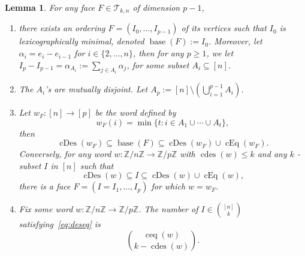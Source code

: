 \documentclass[12pt,reqno]{amsart}
\theoremstyle{plain}
\newtheorem{lemma}[theorem]{Lemma}
\theoremstyle{definition}
\newcommand{\Z}{\mathbb{Z}}
\newcommand{\Tri}{\mathcal{T}_{k,n}}
\DeclareMathOperator{\base}{base}
\DeclareMathOperator{\cEq}{cEq}
\DeclareMathOperator{\cDes}{cDes}
\DeclareMathOperator{\cdes}{cdes}
\DeclareMathOperator{\ceq}{ceq}
\begin{document}
\begin{lemma}\label{lem:alcove_to_word}
	For any face $ F \in \Tri $ of dimension $ p-1 $,
	\begin{enumerate}
		\item there exists an ordering $ F =(I_0,\dots,I_{p-1}) $ of its vertices such that $I_0$ is lexicographically
		minimal, denoted $ \base(F):= I_0 $. Moreover, let $\alpha_i = e_{i} - e_{i-1}$ for $i \in \{2,\dots,n\}$, then
		for any $p \geq 1$, we let $I_{p} - I_{p-1} = \alpha_{A_i}:= \sum_{j\in A_i}\alpha_j$, for some subset $A_i \subseteq [n]$.
		\item The $ A_i $'s are mutually disjoint. Let $ A_{p}:= [n] \setminus \left(\bigcup_{i=1}^{p-1} A_i\right) $.
		\item Let $ w_F: [n] \to [p] $ be the word defined by
		\begin{equation}\label{eq:wF}
			w_F(i) = \min\{t: i \in A_1 \cup \cdots \cup A_t\},
		\end{equation}
		then
		\begin{equation}\label{eq:Fdeseq}
			\cDes(w_F) \subseteq \base(F) \subseteq \cDes(w_F) \cup \cEq(w_F).
		\end{equation}
		Conversely, for any word $ w: \Z/n\Z \to \Z/p\Z $ with $ \cdes(w) \leq k $ and any $ k $ -subset $ I $ in $ [n] $ such that
		\begin{equation}\label{eq:deseq}
			\cDes(w) \subseteq I \subseteq \cDes(w) \cup \cEq(w),
		\end{equation}
		there is a face $ F = (I = I_1,\dots,I_{p}) $ for which $ w = w_F $.
		\item Fix some word $ w: \Z/n\Z \to \Z/p\Z $. The number of $ I \in \binom{[n]}{k} $
		satisfying~\eqref{eq:deseq} is
		\[
			\binom{\ceq(w)}{k - \cdes(w)}.
		\]
	\end{enumerate}
\end{lemma}
\end{document}
